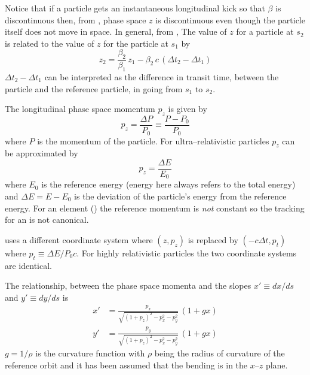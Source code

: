 Notice that if a particle gets an instantaneous longitudinal kick so that $\beta$ is discontinuous
then, from , phase space $z$ is discontinuous even though the particle itself does not
move in space. In general, from , The value of $z$ for a particle at $s_2$ is related to
the value of $z$ for the particle at $s_1$ by
\begin{equation}
  z_2 = \frac{\beta_2}{\beta_1} \, z_1 - 
  \beta_2 \, c \, (\Delta t_2 - \Delta t_1)
  \label{zbbzb}
\end{equation}
$\Delta t_2 - \Delta t_1$ can be interpreted as the difference in transit time, between the particle
and the reference particle, in going from $s_1$ to $s_2$.

The longitudinal phase space momentum $p_z$ is given by
\begin{equation}
  p_z = \frac{\Delta P}{P_0} \equiv \frac{P - P_0}{P_0}
  \label{ppppp}
\end{equation}
where $P$ is the momentum of the particle. For ultra--relativistic particles $p_z$ can be
approximated by
\begin{equation}
  p_z = \frac{\Delta E}{E_0}
\end{equation}
where $E_0$ is the reference energy (energy here always refers to the total energy) and $\Delta E =
E - E_0$ is the deviation of the particle's energy from the reference energy. For an 
element () the reference momentum is {\it not} constant so the tracking for an
 is not canonical.

\mad uses a different coordinate system where $(z, p_z)$ is replaced by $(-c\Delta t, p_t)$ where
$p_t \equiv \Delta E / P_0 c$. For highly relativistic particles the two coordinate systems are
identical.

The relationship, between the phase space momenta and the slopes $x' \equiv dx/ds$ and $y' \equiv dy/ds$
is
\begin{align}
  x' &= \frac{p_x}{\sqrt{(1 + p_z)^2 - p_x^2 - p_y^2}} \, (1 + g x) \\
  y' &= \frac{p_y}{\sqrt{(1 + p_z)^2 - p_x^2 - p_y^2}} \, (1 + g x) 
  \label{xpa1p}
\end{align}
$g = 1/\rho$ is the curvature function with $\rho$ being the radius of curvature of the reference
orbit and it has been assumed that the bending is in the $x$--$z$ plane.

